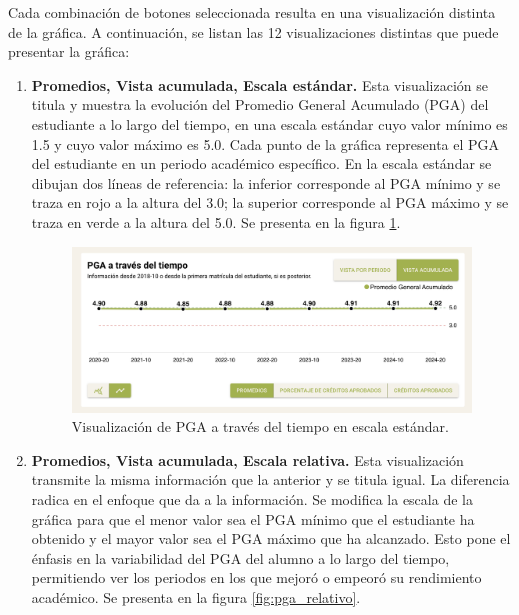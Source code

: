 Cada combinación de botones seleccionada resulta en una visualización distinta de la gráfica. A continuación, se listan las 12 visualizaciones distintas que puede presentar la gráfica:
\begin{enumerate}
	\item \textbf{Promedios, Vista acumulada, Escala estándar.} Esta visualización se titula  y muestra la evolución del Promedio General Acumulado (PGA) del estudiante a lo largo del tiempo, en una escala estándar cuyo valor mínimo es 1.5 y cuyo valor máximo es 5.0. Cada punto de la gráfica representa el PGA del estudiante en un periodo académico específico. En la escala estándar se dibujan dos líneas de referencia: la inferior corresponde al PGA mínimo y se traza en rojo a la altura del 3.0; la superior corresponde al PGA máximo y se traza en verde a la altura del 5.0. Se presenta en la figura \ref{fig:pga_estandar}.

	      \begin{figure}[H]
		      \noindent
		      \hspace{\leftmargin}
		      \begin{minipage}{\dimexpr\linewidth-\leftmargin\relax}
			      \includegraphics[width=\linewidth]{assets/nes/pga_estandar.png}
			      \caption{Visualización de PGA a través del tiempo en escala estándar.}
			      \label{fig:pga_estandar}
		      \end{minipage}
	      \end{figure}

	\item \textbf{Promedios, Vista acumulada, Escala relativa.} Esta visualización transmite la misma información que la anterior y se titula igual. La diferencia radica en el enfoque que da a la información. Se modifica la escala de la gráfica para que el menor valor sea el PGA mínimo que el estudiante ha obtenido y el mayor valor sea el PGA máximo que ha alcanzado. Esto pone el énfasis en la variabilidad del PGA del alumno a lo largo del tiempo, permitiendo ver los periodos en los que mejoró o empeoró su rendimiento académico. Se presenta en la figura \ref{fig:pga_relativo}.


\end{enumerate}
